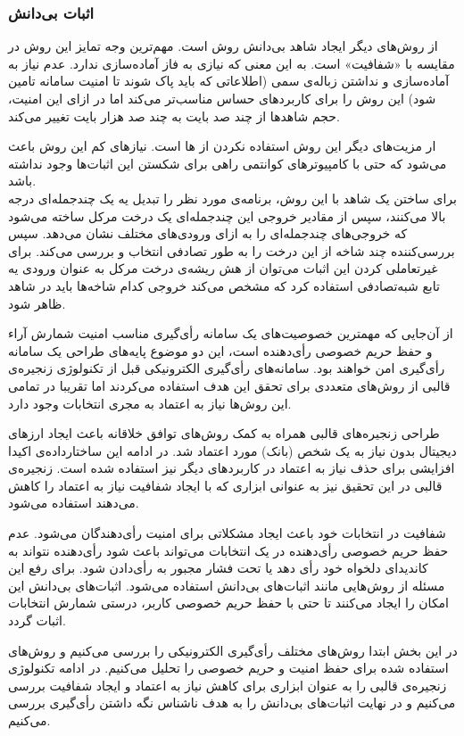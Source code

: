 \subsubsection{اثبات بی‌دانش }
از روش‌های دیگر ایجاد شاهد بی‌دانش روش 
\cite{zkstark}
است. مهم‌ترین وجه تمایز این روش در مقایسه با
 «شفافیت»
است. به این معنی که نیازی به فاز آماده‌سازی ندارد. عدم نیاز به آماده‌سازی و نداشتن زباله‌ی سمی (اطلاعاتی که باید پاک شوند تا امنیت سامانه تامین شود) این روش را برای کاربرد‌های حساس مناسب‌تر می‌کند اما در ازای این امنیت، حجم شاهد‌ها از چند صد بایت به چند صد هزار بایت تغییر می‌کند.
\par
ار مزیت‌های دیگر این روش استفاده نکردن از 
ها
است. نیاز‌های کم این روش باعث می‌شود که حتی با کامپیوتر‌های کوانتمی
 راهی برای شکستن این اثبات‌ها وجود نداشته باشد.
\\
برای ساختن یک شاهد با این روش، برنامه‌ی مورد نظر را تبدیل یه یک چندجمله‌ای درجه بالا می‌کنند، سپس از مقادیر خروجی این چندجمله‌ای یک درخت مرکل ساخته می‌شود که خروجی‌های چند‌جمله‌ای را به ازای ورودی‌های مختلف نشان می‌دهد. سپس بررسی‌کننده چند شاخه از این درخت را به طور تصادفی انتخاب و بررسی می‌کند. برای غیرتعاملی کردن این اثبات می‌توان از هش ریشه‌ی درخت مرکل به عنوان ورودی یه تابع شبه‌تصادفی
استفاده کرد که مشخص می‌کند خروجی کدام شاخه‌ها باید در شاهد ظاهر شود. 






از آن‌جایی که مهمترین خصوصیت‌های یک سامانه رأی‌گیری مناسب امنیت شمارش آراء و حفظ حریم خصوصی رأی‌دهنده است، این دو موضوع پایه‌های طراحی یک سامانه رأی‌گیری امن خواهند بود. سامانه‌های رأی‌گیری الکترونیکی قبل از تکنولوژی زنجیره‌ی قالبی از روش‌های متعددی برای تحقق این هدف استفاده می‌کردند اما تقریبا در تمامی این روش‌ها نیاز به اعتماد به مجری انتخابات وجود دارد. 
\par
طراحی زنجیره‌های قالبی همراه به کمک روش‌های توافق خلاقانه باعث ایجاد ارز‌های دیجیتال بدون نیاز به یک شخص (بانک) مورد اعتماد شد. در ادامه این ساختارداده‌ی اکیدا افزایشی برای حذف نیاز به اعتماد در کاربردهای دیگر نیز استفاده شده است. زنجیره‌ی قالبی در این تحقیق نیز به عنوانی ابزاری که با ایجاد شفافیت نیاز به اعتماد را کاهش می‌دهند استفاده می‌شود.
\par 
شفافیت در انتخابات خود باعث ایجاد مشکلاتی برای امنیت رأی‌دهندگان می‌شود. عدم حفظ حریم خصوصی رأی‌دهنده در یک انتخابات می‌تواند باعث شود رأی‌دهنده نتواند به کاندیدای دلخواه خود رأی دهد یا تحت فشار مجبور به رأی‌دادن شود. برای رفع این مسئله از روش‌هایی مانند اثبات‌های بی‌دانش استفاده می‌شود. اثبات‌های بی‌دانش این امکان را ایجاد می‌کنند تا حتی با حفظ حریم خصوصی کاربر، درستی شمارش انتخابات اثبات گردد.
\par
در این بخش ابتدا روش‌های مختلف رأی‌گیری الکترونیکی را بررسی می‌کنیم و روش‌های استفاده شده برای حفظ امنیت و حریم خصوصی را تحلیل می‌کنیم. در ادامه تکنولوژی زنجیره‌ی قالبی را به عنوان ابزاری برای کاهش نیاز به اعتماد و ایجاد شفافیت بررسی می‌کنیم و در نهایت اثبات‌های بی‌دانش را به هدف ناشناس نگه‌ داشتن رأی‌گیری بررسی می‌کنیم.

